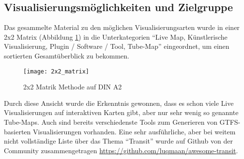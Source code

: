 \subsection{Visualisierungsmöglichkeiten und Zielgruppe}
\label{sub:visualisierungsmöglichkeiten_und_zielgruppe}

  Das gesammelte Material zu den möglichen Visualisierungsarten wurde in einer 2x2 Matrix (Abbildung \ref{fig:2x2_matrix}) in die Unterkategorien "`Live Map, Künstlerische Visualisierung, Plugin / Software / Tool, Tube-Map"' eingeordnet, um einen sortierten Gesamtüberblick zu bekommen. 

  \begin{figure}[htbp]
    \begin{center}
      \texttt{[image: 2x2\_matrix]}
      \caption{2x2 Matrik Methode auf DIN A2}
      \label{fig:2x2_matrix}
    \end{center}
  \end{figure}

  Durch diese Ansicht wurde die Erkenntnis gewonnen, dass es schon viele Live Visualisierungen auf interaktiven Karten gibt, aber nur sehr wenig so genannte Tube-Maps. Auch sind bereits verschiedenste Tools zum Generieren von GTFS-basierten Visualisierungen vorhanden. Eine sehr ausführliche, aber bei weitem nicht vollständige Liste über das Thema "`Transit"' wurde auf Github von der Community zusammengetragen \url{https://github.com/luqmaan/awesome-transit}.


